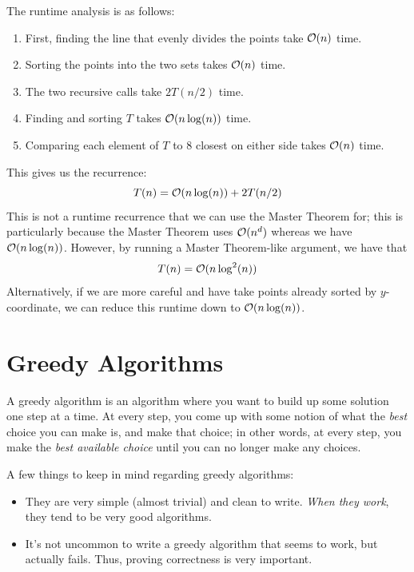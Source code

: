\documentclass[letterpaper]{article}
\begin{document}
The runtime analysis is as follows: 
\begin{enumerate}[\hspace{0.5cm}(a)]
    \item First, finding the line that evenly divides the points take $\mathcal{O}(n)$ time. 
    \item Sorting the points into the two sets takes $\mathcal{O}(n)$ time. 
    \item The two recursive calls take $2T(n / 2)$ time. 
    \item Finding and sorting $T$ takes $\mathcal{O}(n\log(n))$ time. 
    \item Comparing each element of $T$ to 8 closest on either side takes $\mathcal{O}(n)$ time. 
\end{enumerate}
This gives us the recurrence: 
\[T(n) = \mathcal{O}(n\log(n)) + 2T(n / 2)\]
This is not a runtime recurrence that we can use the Master Theorem for; this is particularly because the Master Theorem uses $\mathcal{O}(n^d)$ whereas we have $\mathcal{O}(n\log(n))$. However, by running a Master Theorem-like argument, we have that 
\[T(n) = \mathcal{O}(n\log^{2}(n))\]
Alternatively, if we are more careful and have  take points already sorted by $y$-coordinate, we can reduce this runtime down to $\mathcal{O}(n\log(n))$. 






















\newpage 
\section{Greedy Algorithms}
A greedy algorithm is an algorithm where you want to build up some solution one step at a time. At every step, you come up with some notion of what the \emph{best} choice you can make is, and make that choice; in other words, at every step, you make the \emph{best available choice} until you can no longer make any choices. 

\bigskip 

A few things to keep in mind regarding greedy algorithms:
\begin{itemize}
    \item They are very simple (almost trivial) and clean to write. \emph{When they work}, they tend to be very good algorithms. 
    \item It's not uncommon to write a greedy algorithm that seems to work, but actually fails. Thus, proving correctness is very important. 
\end{itemize}
\end{document}
